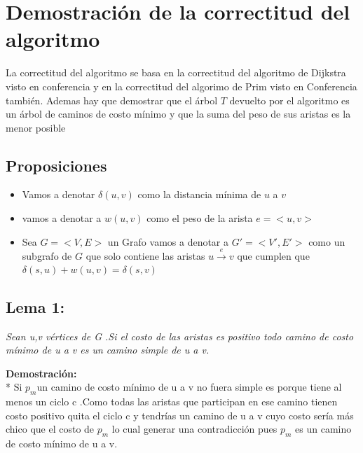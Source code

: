 \documentclass{article}
\begin{document}
    \section{Demostraci\'on  de la correctitud del algoritmo}

    \noindent La correctitud del algoritmo se basa en la correctitud del algoritmo de Dijkstra visto en conferencia 
    y en la correctitud del algorimo de Prim visto en Conferencia tambi\'en. Ademas hay que demostrar que el \'arbol $T$ 
    devuelto por el algoritmo es un \'arbol de caminos de costo m\'inimo y que la suma del peso de sus aristas es la menor posible  
    
    \subsection*{Proposiciones }
    \begin{itemize}
        \item Vamos a denotar $\delta\left(u,v\right)$ como la distancia m\'inima de $u$ a $v$ 
        \item vamos a denotar a $w(u,v)$ como el peso de la arista $e= <u,v>$ 
        \item Sea $G = <V,E>$ un Grafo  vamos a denotar a $G' = <V',E'>$ como un subgrafo de $G$ que solo contiene las aristas $ u \xrightarrow[]{e} v$ 
        que cumplen que $\delta\left(s,u\right) + w \left(u,v\right) = \delta\left(s,v\right)$   
    \end{itemize}

    \subsection*{Lema 1:}

    \textit{Sean u,v v\'ertices de G .Si el costo de las aristas es positivo todo camino de costo m\'inimo de u a v es un camino simple de u a v.}
    
    \vspace*{0.3cm} 

    \noindent \textbf{Demostraci\'on:}
    \\*
    Si $p_{m}$un camino de costo m\'inimo de u a v no fuera simple es porque tiene al menos un ciclo c .Como todas las aristas que participan en ese
    camino tienen costo positivo quita el ciclo c y tendr\'ias un camino de u a v cuyo costo ser\'ia m\'as chico que el costo de $p_{m}$ lo cual generar
    una contradicci\'on pues $p_{m}$ es un camino de costo m\'inimo de u a v.\\
    
\end{document}
